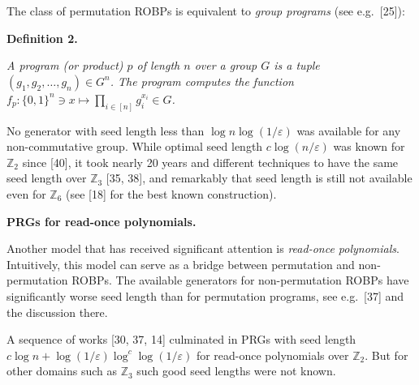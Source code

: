 The class of permutation ROBPs is equivalent to \emph{group
programs} (see e.g. [25]):\par





\par\medskip\noindent\textbf{
\textbf{Definition 2}\textbf{.}
}\par



\emph{A program (or product) $p$ of length $n$ over a group $G$ is a tuple
$(g_{1},g_{2},\ldots,g_{n})\in G^{n}$. The program computes the
function $f_{p}\colon\{0,1\}^{n}\ni x\mapsto\prod_{i\in[n]}g_{i}^{x_{i}}\in G$.}\par






No generator with seed length less than $\log n\log(1/\varepsilon)$ was available
for any non-commutative group. While optimal seed length $c\log(n/\varepsilon)$
was known for $\mathbb{Z}_{2}$ since [40], it took nearly
20 years and different techniques to have the same seed length over
$\mathbb{Z}_{3}$ [35, 38], and remarkably that
seed length is still not available even for $\mathbb{Z}_{6}$ (see [18] for the best known construction).\par





\par\medskip\noindent\textbf{PRGs for read-once polynomials.}\par




Another model that has received significant attention is \emph{read-once
polynomials}. Intuitively, this model can serve as a bridge between
permutation and non-permutation ROBPs. The available generators for
non-permutation ROBPs have significantly worse seed length than for
permutation programs, see e.g. [37] and the discussion
there.\par




A sequence of works [30, 37, 14]
culminated in PRGs with seed length $c\log n+\log(1/\varepsilon)\log^{c}\log(1/\varepsilon)$
for read-once polynomials over $\mathbb{Z}_{2}$. But for other domains
such as $\mathbb{Z}_{3}$ such good seed lengths were not known.\par





